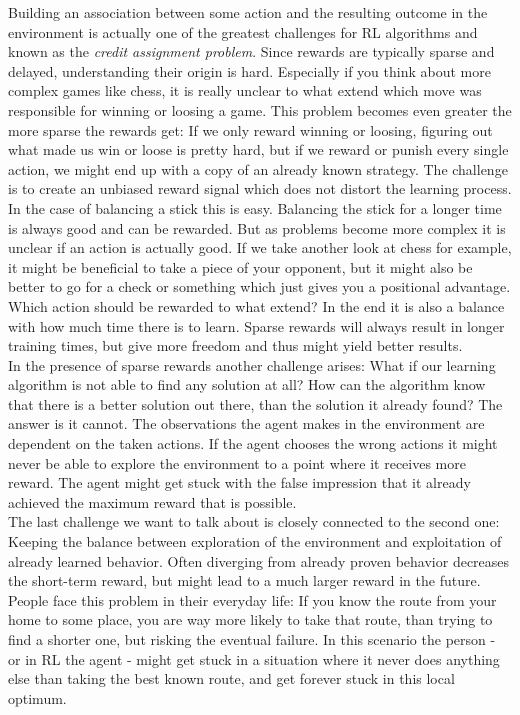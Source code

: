 Building an association between some action and the resulting outcome in the environment is actually one of the greatest challenges for RL algorithms and known as the \textit{credit assignment problem}. Since rewards are typically sparse and delayed, understanding their origin is hard. Especially if you think about more complex games like chess, it is really unclear to what extend which move was responsible for winning or loosing a game. This problem becomes even greater the more sparse the rewards get: If we only reward winning or loosing, figuring out what made us win or loose is pretty hard, but if we reward or punish every single action, we might end up with a copy of an already known strategy. The challenge is to create an unbiased reward signal which does not distort the learning process. In the case of balancing a stick this is easy. Balancing the stick for a longer time is always good and can be rewarded. But as problems become more complex it is unclear if an action is actually good. If we take another look at chess for example, it might be beneficial to take a piece of your opponent, but it might also be better to go for a check or something which just gives you a positional advantage. Which action should be rewarded to what extend? In the end it is also a balance with how much time there is to learn. Sparse rewards will always result in longer training times, but give more freedom and thus might yield better results. \\
In the presence of sparse rewards another challenge arises: What if our learning algorithm is not able to find any solution at all? How can the algorithm know that there is a better solution out there, than the solution it already found? The answer is it cannot. The observations the agent makes in the environment are dependent on the taken actions. If the agent chooses the wrong actions it might never be able to explore the environment to a point where it receives more reward. The agent might get stuck with the false impression that it already achieved the maximum reward that is possible. \\
The last challenge we want to talk about is closely connected to the second one: Keeping the balance between exploration of the environment and exploitation of already learned behavior. Often diverging from already proven behavior decreases the short-term reward, but might lead to a much larger reward in the future. People face this problem in their everyday life: If you know the route from your home to some place, you are way more likely to take that route, than trying to find a shorter one, but risking the eventual failure. In this scenario the person - or in RL the agent - might get stuck in a situation where it never does anything else than taking the best known route, and get forever stuck in this local optimum.

